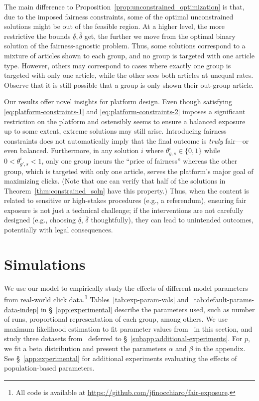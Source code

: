 \documentclass[letterpaper]{article} %
\begin{document}
The main difference to Proposition~\ref{prop:unconstrained_optimization} is that, due to the imposed fairness constraints, some of the optimal unconstrained solutions might be out of the feasible region.
At a higher level, the more restrictive the bounds $\underline{\delta}, \overline{\delta}$ get, the further we move from the optimal binary solution of the fairness-agnostic problem.
Thus, some solutions correspond to a mixture of articles shown to each group, and no group is targeted with one article type.
However, others may correspond to cases where exactly one group is targeted with only one article, while the other sees both articles at unequal rates.
Observe that it is still possible that a group is only shown their out-group article.

Our results offer novel insights for platform design.
Even though satisfying \eqref{eq:platform-constraints-1} and \eqref{eq:platform-constraints-2} imposes a significant restriction on the platform and ostensibly seems to ensure a balanced exposure up to some extent, extreme solutions may still arise.
Introducing fairness constraints does not automatically imply that the final outcome is \textit{truly} fair---or even balanced.
Furthermore, in any solution $i$ where $\theta_{g,s}^i \in \{0,1\}$ while $0<\theta_{g',s}^i<1$, only one group incurs the ``price of fairness'' whereas the other group, which is targeted with only one article, serves the platform's major goal of maximizing clicks.
(Note that one can verify that half of the solutions in Theorem~\ref{thm:constrained_soln} have this property.)
Thus, when the content is related to sensitive or high-stakes procedures (e.g., a referendum), ensuring fair exposure is not just a technical challenge; if the interventions are not carefully designed (e.g., choosing $\underline{\delta}$, $\overline{\delta}$ thoughtfully), they can lead to unintended outcomes, potentially with legal consequences.

\section{Simulations}\label{sec:simulations}

We use our model to empirically study the effects of different model parameters from real-world click data.\footnote{All code is available at \url{https://github.com/jfinocchiaro/fair-exposure}.}
Tables~\ref{tab:exp-param-vals} and~\ref{tab:default-params-data-indep} in \S~\ref{app:experimental} describe the parameters used, such as number of runs, proportional representation of each group, among others.
We use maximum likelihood estimation to fit parameter values from~\citet{ReplicationExposure} in this section, and study three datasets from~\citet{balancedExposure} deferred to \S~\ref{subapp:additional-experiments}.
For $p$, we fit a beta distribution and present the parameters $\alpha$ and $\beta$ in the appendix.
See \S~\ref{app:experimental} for additional experiments evaluating the effects of population-based parameters.
\end{document}
